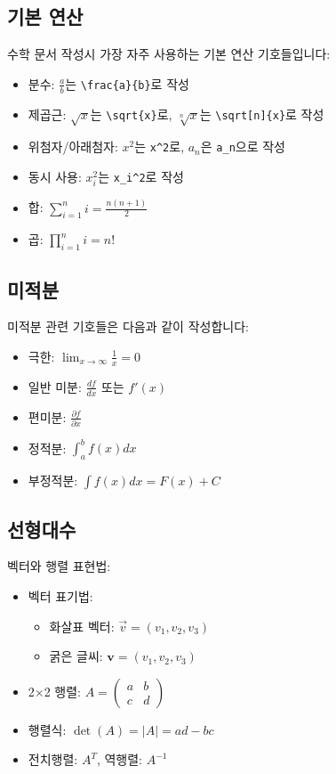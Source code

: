 \documentclass[12pt,a4paper]{article}
\begin{document}
\subsection{기본 연산}
수학 문서 작성시 가장 자주 사용하는 기본 연산 기호들입니다:

\begin{itemize}
    \item 분수: $\frac{a}{b}$는 \verb|\frac{a}{b}|로 작성
    \item 제곱근: $\sqrt{x}$는 \verb|\sqrt{x}|로, $\sqrt[n]{x}$는 \verb|\sqrt[n]{x}|로 작성
    \item 위첨자/아래첨자: $x^2$는 \verb|x^2|로, $a_n$은 \verb|a_n|으로 작성
    \item 동시 사용: $x_i^2$는 \verb|x_i^2|로 작성
    \item 합: $\sum_{i=1}^{n} i = \frac{n(n+1)}{2}$
    \item 곱: $\prod_{i=1}^{n} i = n!$
\end{itemize}

\subsection{미적분}
미적분 관련 기호들은 다음과 같이 작성합니다:

\begin{itemize}
    \item 극한: $\lim_{x \to \infty} \frac{1}{x} = 0$
    \item 일반 미분: $\frac{df}{dx}$ 또는 $f'(x)$
    \item 편미분: $\frac{\partial f}{\partial x}$
    \item 정적분: $\int_{a}^{b} f(x) dx$
    \item 부정적분: $\int f(x) dx = F(x) + C$
\end{itemize}

\subsection{선형대수}
벡터와 행렬 표현법:

\begin{itemize}
    \item 벡터 표기법:
    \begin{itemize}
        \item 화살표 벡터: $\vec{v} = (v_1, v_2, v_3)$
        \item 굵은 글씨: $\mathbf{v} = (v_1, v_2, v_3)$
    \end{itemize}
    \item 2×2 행렬: $A = \begin{pmatrix} a & b \\ c & d \end{pmatrix}$
    \item 행렬식: $\det(A) = |A| = ad - bc$
    \item 전치행렬: $A^T$, 역행렬: $A^{-1}$
\end{itemize}
\end{document}
